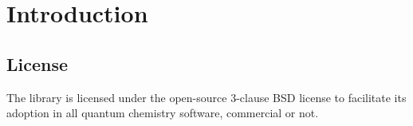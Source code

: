 \section{Introduction}


\subsection{License}

The library is licensed under the open-source 3-clause BSD license to facilitate
its adoption in all quantum chemistry software, commercial or not.

\
